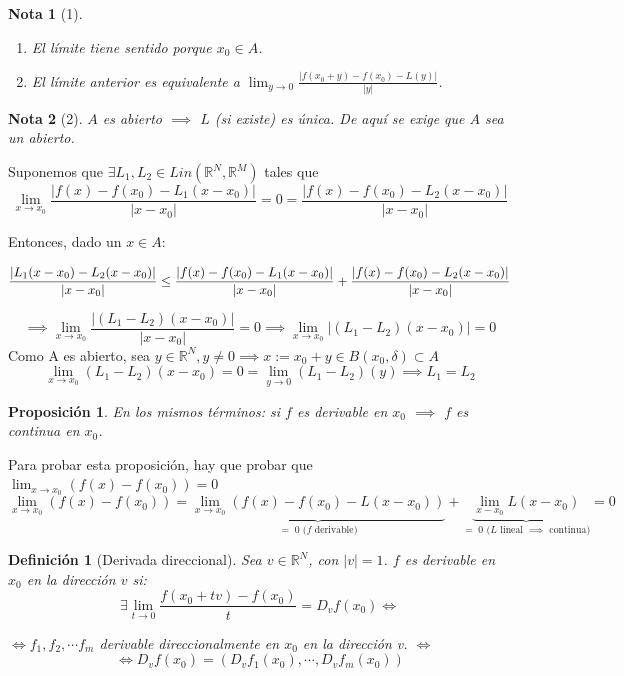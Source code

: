 \documentclass[11pt, a4paper, titlepage]{article}
\makeatletter
\renewenvironment{proof}[1][\proofname] {\vspace{-15pt}\par\pushQED{\qed}\normalfont\topsep6\p@\@plus6\p@\relax\trivlist\item[\hskip\labelsep\it#1\@addpunct{.}]\ignorespaces}{\popQED\endtrivlist\@endpefalse}
\theoremstyle{theorem-style}
\newtheorem*{nprop}{Proposición}
\theoremstyle{definition-style}
\newtheorem*{ndef}{Definición}
\theoremstyle{remark-style}
\newtheorem*{nota}{Nota}
\theoremstyle{example-style}
\newenvironment{nlist}
{\begin{enumerate}
\renewcommand\labelenumi{(\emph{\roman{enumi})}}}
{\end{enumerate}}
\makeatother
\begin{document}
\begin{nota}[1]\hfill
	\begin{nlist}
		\item El límite tiene sentido porque $x_0\in A$.
		\item El límite anterior es equivalente a $\lim_{y\to 0} \frac{|f(x_0+y)-f(x_0)-L(y)|}{|y|}$.
	\end{nlist}
\end{nota}

\begin{nota}[2]
	$A$ es abierto $\implies$ $L$ (si existe) es única. De aquí se exige que $A$ sea un abierto. 
\end{nota}

\begin{proof}[Demostración (Nota 2)]
	Suponemos que $\exists L_1,L_2\in Lin(\mathbb{R}^N, \mathbb{R}^M)$ tales que 
\[
\lim_{x\to x_0} \frac{|f(x)-f(x_0)- L_1(x-x_0)|}{|x-x_0|} =0= \frac{|f(x)-f(x_0)- L_2(x-x_0)|}{|x-x_0|}
\]

Entonces, dado un $x\in A$:

\begin{align}
	\frac{|L_1(x-x_0) - L_2(x-x_0)|}{|x-x_0|} \le \frac{|f(x)-f(x_0)- L_1(x-x_0)|}{|x-x_0|} + \frac{|f(x)-f(x_0)- L_2(x-x_0)|}{|x-x_0|}\notag
\end{align}

\[
\implies \lim_{x\to x_0} \frac{|(L_1-L_2)(x-x_0)|}{|x-x_0|} = 0 \implies \lim_{x\to x_0}|(L_1 -L_2)(x-x_0)|=0
\]
Como A es abierto, sea $y \in \mathbb{R}^N, y \neq 0 \implies x:=x_0+y \in B(x_0, \delta) \subset A$\\
$$\lim_{x\to x_0}(L_1-L_2)(x-x_0)=0=\lim_{y\to 0}(L_1-L_2)(y)\implies L_1=L_2$$
\end{proof}

\begin{nprop} En los mismos términos: si $f$ es derivable en $x_0$ $\implies$ $f$ es continua en $x_0$.
	
\end{nprop}

\begin{proof} Para probar esta proposición, hay que probar que $\lim_{x\to x_0} (f(x)-f(x_0)) = 0$
\[
	\lim_{x\to x_0} (f(x)-f(x_0)) = \underbrace{\lim_{x\to x_0} (f(x)-f(x_0)-L(x-x_0))}_{=\;0 \text{ ($f$ derivable)}} + \underbrace{\lim_{x-x_0} L(x-x_0)}_{=\; 0 \text{ ($L$ lineal $\implies$ continua)}} = 0
\]
\end{proof}

\begin{ndef}[Derivada direccional]
	Sea $v\in \mathbb{R}^N$, con $|v| = 1$. $f$ es derivable en $x_0$ en la dirección $v$ si:
	\[
		\exists \lim_{t\to 0} \frac{f(x_0+tv)-f(x_0)}{t} = D_v f(x_0) \iff
	\]
	
	\begin{center}
	$\iff f_1,f_2,\cdots f_m$ derivable direccionalmente en $x_0$ en la dirección v. $\iff$
	\[
	\iff D_vf(x_0) = (D_vf_1(x_0),\cdots,D_vf_m(x_0))
	\]
\end{center}
\end{ndef}
\end{document}

